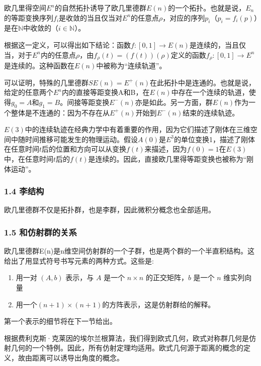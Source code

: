 欧几里得空间$E^n$的自然拓扑诱导了欧几里德群$E(n)$的一个拓扑。也就是说，$E_n$的等距变换序列$f_i$是收敛的当且仅当对$E^n$的任意点$\rho$，对应的序列$p_i$（$p_i = f_i(p)$）是在$\mathbb{N}$中收敛的（$i \in \mathbb{N}$）。

根据这一定义，可以得出如下结论：函数$f: [0,1] \rightarrow E(n)$是连续的，当且仅当，对于$E^n$内的任意点$\rho$，由$f_{\rho}(t) = (f(t))(\rho)$定义的函数$f_{\rho}: [0,1] \rightarrow E^n$是连续的。这种函数在$E(n)$中被称为“连续轨道”。

可以证明，特殊的几里德群$SE(n) = E^+(n)$在此拓扑中是连通的。也就是说，给定的任意两个$E^n$内的直接等距变换A和B，在$E(n)$中存在一个连续的轨道，使得$g_0 = A$和$g_1 = B$。间接等距变换$E^-(n)$亦是如此。另一方面，群$E(n)$作为一个整体是不连通的：因为不存在从$E^+(n)$开始到$E^-(n)$结束的连续轨迹。

$E(3)$中的连续轨迹在经典力学中有着重要的作用，因为它们描述了刚体在三维空间中随时间推移可能发生的物理运动。假设$A(0)$是$E^3$的单位变换1，描述了刚体在任意时间$t$后的位置和方向可以从变换$f(t)$来描述，因为$f(0) = 1$在$E(3)$中，在任意时间$t$后的$f(t)$是连续的。因此，直接欧几里得等距变换也被称为“刚体运动”。


\subsubsection{1.4 李结构}

欧几里德群不仅是拓扑群，也是李群，因此微积分概念也全部适用。

\subsubsection{1.5 和仿射群的关系}

欧几里德群E(n)是n维空间仿射群的一个子群，也是两个群的一个半直积结构。这给出了用显式符号书写元素的两种方式。这些是:

\begin{enumerate}
\item 用一对 $(A, b)$ 表示，与 $A$ 是一个 $n \times n$ 的正交矩阵，$b$ 是一个 $n$ 维实列向量
\item 用一个$(n + 1)\times(n + 1)$的方阵表示，这是仿射群给的解释。
\end{enumerate}

第一个表示的细节将在下一节给出。

根据费利克斯·克莱因的埃尔兰根算法，我们得到欧式几何，欧式对称群几何是仿射几何的一个特例。因此，所有仿射定理均适用。欧式几何源于距离的概念的定义，故由距离可以诱导出角度的概念。

